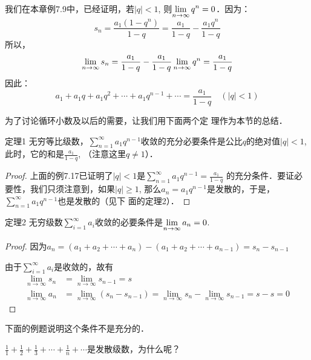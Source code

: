 \begin{solution}
    我们在本章例7.9中，已经证明，若$|q|<1$, 则$\displaystyle\lim_{n\to\infty}q^n=0$．因为：
\[s_n=\frac{a_1(1-q^n)}{1-q}=\frac{a_1}{1-q}-\frac{a_1q^n}{1-q}\]
所以，
\[\displaystyle\lim_{n\to\infty}s_n=\dfrac{a_1}{1-q}-\dfrac{a_1}{1-q}\displaystyle\lim_{n\to\infty}q^n=\dfrac{a_1}{1-q}\]
因此：\[a_1+a_1q+a_1q^2+\cdots +a_1q^{n-1}+\cdots=\frac{a_1}{1-q} \quad (|q|<1)\]
\end{solution}

为了讨论循环小数及以后的需要，让我们用下面两个定
理作为本节的总结．

\begin{blk}{定理1}
    无穷等比级数，$\sum^{\infty}_{n=1}a_1q^{n-1}$收敛的充分必要条件是公比$q$的绝对值$|q|<1$, 此时，它的和是$\frac{a_1}{1-q}$, （注意这里$q\ne 1$）．
\end{blk}

\begin{proof}
    上面的例7.17已证明了$|q|<1$是$\sum^{\infty}_{n=1}a_1q^{n-1}=\frac{a_1}{1-q}$
的充分条件．要证必要性，我们只须注意到，如果$|q|\ge 1$, 
那么$a_n=a_1q^{n-1}$是发散的，于是，$\sum^{\infty}_{n=1}a_1q^{n-1}$也是发散的（见下
面的定理2）．
\end{proof}

\begin{blk}{定理2}
无穷级数$\sum^{\infty}_{i=1}a_i$收敛的必要条件是$\displaystyle\lim_{n\to \infty}a_n=0$.
\end{blk}

\begin{proof}
因为$a_n=(a_1+a_2+\cdots +a_n)-(a_1+a_2+\cdots +a_{n-1})
=s_n-s_{n-1}$

由于$\sum^{\infty}_{i=1}a_i$是收敛的，故有
\[\begin{split}
    \lim_{n\to\infty}s_n&=\lim_{n\to\infty}s_{n-1}=s\\
    \lim_{n\to\infty}a_n&=\lim_{n\to\infty}(s_n-s_{n-1})=\lim_{n\to\infty}s_n-\lim_{n\to\infty}s_{n-1}=s-s=0
\end{split}\]
\end{proof}

下面的例题说明这个条件不是充分的．


\begin{example}
    $\frac{1}{1}+\frac{1}{2}+\frac{1}{3}+\cdots +\frac{1}{n}+\cdots$是发散级数，为什么呢？
\end{example}


